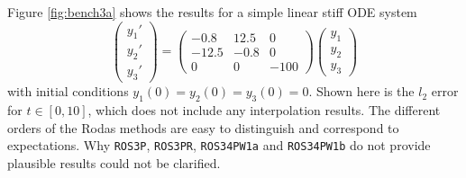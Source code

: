 \documentclass{juliacon}
\begin{document}
Figure \ref{fig:bench3a} shows the results for a simple linear stiff ODE system
\begin{equation}
\begin{pmatrix} y_1'\\y_2'\\y_3' \end{pmatrix} =
\begin{pmatrix} -0.8 &12.5& 0\\ -12.5& -0.8& 0\\ 0& 0& -100 \end{pmatrix}
\begin{pmatrix} y_1\\y_2\\y_3 \end{pmatrix}   
\label{eq:stiffode}
\end{equation}
with initial conditions $y_1(0)=y_2(0)=y_3(0)=0$.
Shown here is the $l_2$ error for $t \in [0,10]$, which does not include any interpolation results. The different orders of the Rodas methods are easy to distinguish and correspond to expectations. 
Why \verb|ROS3P|, \verb|ROS3PR|, \verb|ROS34PW1a| and \verb|ROS34PW1b| do not provide plausible results could not be clarified.
\end{document}
